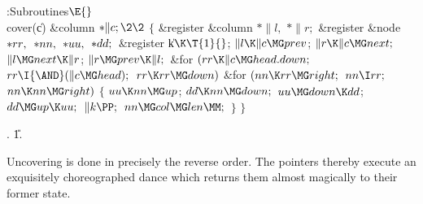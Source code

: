 \Y\B\4:Subroutines\X${}\E{}$\6
\\{cover}(\|c)\1\1\6
\&{column} ${}{*}\|c;\2\2{}$\6
${}\{{}$\5
\1\&{register} \&{column} ${}{*}\|l,{}$ ${}{*}\|r;{}$\6
\&{register} \&{node} ${}{*}\\{rr},{}$ ${}{*}\\{nn},{}$ ${}{*}\\{uu},{}$ ${}{*}%
\\{dd};{}$\6
\&{register} \|k${}\K\T{1}{}$;\7
${}\|l\K\|c\MG\\{prev}{}$;\5
${}\|r\K\|c\MG\\{next};{}$\6
${}\|l\MG\\{next}\K\|r{}$;\5
${}\|r\MG\\{prev}\K\|l;{}$\6
\&{for} ${}(\\{rr}\K\|c\MG\\{head}.\\{down};{}$ ${}\\{rr}\I{\AND}(\|c\MG%
\\{head});{}$ ${}\\{rr}\K\\{rr}\MG\\{down}){}$\1\6
\&{for} ${}(\\{nn}\K\\{rr}\MG\\{right};{}$ ${}\\{nn}\I\\{rr};{}$ ${}\\{nn}\K%
\\{nn}\MG\\{right}){}$\5
${}\{{}$\1\6
${}\\{uu}\K\\{nn}\MG\\{up}{}$;\5
${}\\{dd}\K\\{nn}\MG\\{down};{}$\6
${}\\{uu}\MG\\{down}\K\\{dd}{}$;\5
${}\\{dd}\MG\\{up}\K\\{uu};{}$\6
${}\|k\PP;{}$\6
${}\\{nn}\MG\\{col}\MG\\{len}\MM;{}$\6
\4${}\}{}$\2\2\6
\4${}\}{}$\2\par
{}.
\U1.\fi

Uncovering is done in precisely the reverse order.
The pointers thereby
execute an exquisitely choreo\-graphed dance which returns them almost
magically to their former state.

